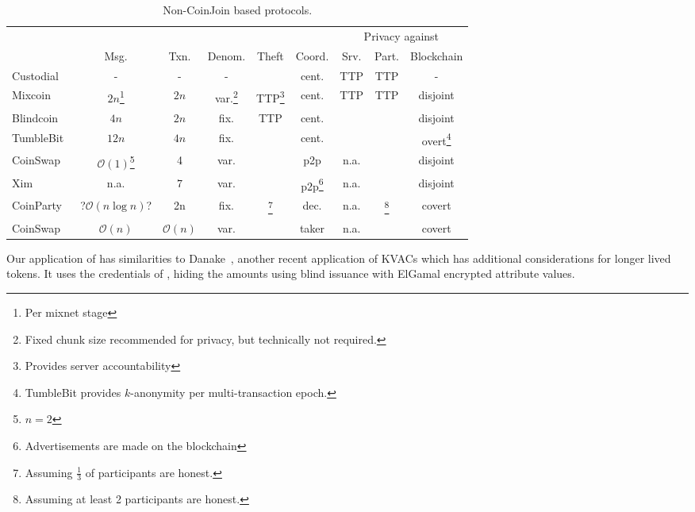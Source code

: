 \documentclass[a4paper]{article}
\newcommand{\cmark}{\ding{51}}%
\newcommand{\xmark}{\ding{55}}%
\begin{document}
\begin{table}[h!]
\begin{minipage}{\textwidth}
\renewcommand{\thefootnote}{\thempfootnote} %
\centering
\begin{tabular}{lcccccccc}
	&&&&&& \multicolumn{3}{c}{Privacy against} \\
	&Msg. &Txn. & Denom. & Theft & Coord. & Srv. & Part. & Blockchain \\

	Custodial & - & - & - & \xmark & cent. & TTP & TTP & - \\
	Mixcoin~\cite{bonneau2014mixcoin} & $2n$\footnote{Per mixnet stage}      & $2n$\footnotemark[\value{footnote}] & var.\footnote{Fixed chunk size recommended for privacy, but technically not required.} & TTP\footnote{Provides server accountability} & cent. & TTP & TTP & disjoint \\
	Blindcoin~\cite{valenta2015blindcoin} & $4n$      & $2n$ & fix.  & TTP\footnotemark[\value{footnote}] & cent. & \cmark & \cmark & disjoint \\
	TumbleBit~\cite{heilman2017tumblebit} & $12n$      & $4n$ & fix. & \cmark &  cent. & \cmark & \cmark & overt\footnote{TumbleBit provides $k$-anonymity per multi-transaction epoch.} \\
	CoinSwap\cite{maxwell2013coinswap} & $\mathcal{O}(1)$\footnote{$n=2$} & 4\footnotemark[\value{footnote}] & var. & \cmark & p2p & n.a. & \xmark & disjoint \\
	Xim~\cite{bissias2014sybil} & n.a. & $7$\footnotemark[\value{footnote}] & var. & \cmark &  p2p\footnote{Advertisements are made on the blockchain} & n.a. & \xmark & disjoint \\
	CoinParty~\cite{ziegeldorf2015coinparty}& ?$\mathcal{O}(n \log n)$? & 2n & fix. & \cmark\footnote{Assuming $\frac{1}{3}$ of participants are honest.} & dec. & n.a. & \cmark\footnote{Assuming at least 2 participants are honest.} & covert \\
	CoinSwap\cite{belcher2020design} & $\mathcal{O}(n)$ & $\mathcal{O}(n)$ & var. & \cmark &  taker & n.a. & \cmark & covert \\
\end{tabular}
\end{minipage}
\caption{Non-CoinJoin based protocols.}
\label{table:noncoinjoin}
\end{table}

Our application of \cite{chase2019signal} has similarities to Danake~\cite{devalence2020danake}, another recent application of KVACs which has additional considerations for longer lived tokens. It uses the credentials of \cite{chase2014algebraic}, hiding the amounts using blind issuance with ElGamal encrypted attribute values.
\end{document}
